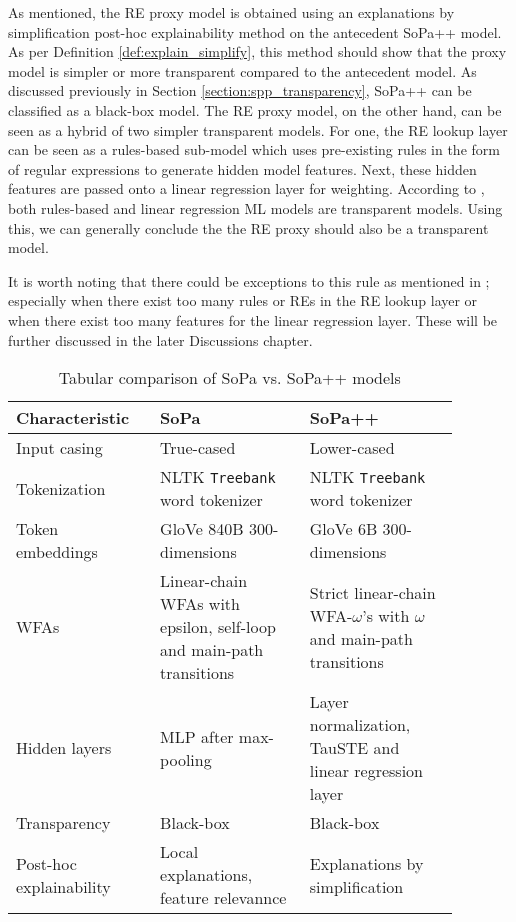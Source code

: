 \label{sec:re_transparency}

As mentioned, the RE proxy model is obtained using an explanations by
simplification post-hoc explainability method on the antecedent SoPa++ model. As
per Definition \ref{def:explain_simplify}, this method should show that the
proxy model is simpler or more transparent compared to the antecedent model. As
discussed previously in Section \ref{section:spp_transparency}, SoPa++ can be
classified as a black-box model. The RE proxy model, on the other hand, can be
seen as a hybrid of two simpler transparent models. For one, the RE lookup layer
can be seen as a rules-based sub-model which uses pre-existing rules in the form
of regular expressions to generate hidden model features. Next, these hidden
features are passed onto a linear regression layer for weighting. According to
\citet[Page 7, Section 3]{arrieta2020explainable}, both rules-based and linear
regression ML models are transparent models. Using this, we can generally
conclude the the RE proxy should also be a transparent model.

It is worth noting that there could be exceptions to this rule as mentioned in
\citet[Page 9, Table 2]{arrieta2020explainable}; especially when there exist too
many rules or REs in the RE lookup layer or when there exist too many features
for the linear regression layer. These will be further discussed in the later
Discussions chapter.

\begin{table}[t!]
  \centering {}
  \begin{tabular}{L{0.275\linewidth} L{0.3\linewidth} L{0.3\linewidth}}
    \toprule
    Characteristic & SoPa & SoPa++ \\
    \midrule
    Input casing & True-cased & Lower-cased \\ 
    Tokenization & NLTK \texttt{Treebank} word tokenizer & NLTK \texttt{Treebank} word tokenizer\\
    Token embeddings & GloVe 840B 300-dimensions & GloVe 6B 300-dimensions \\
    WFAs & Linear-chain WFAs with epsilon, self-loop and main-path transitions & Strict linear-chain WFA-$\omega$'s with $\omega$ and main-path transitions \\
    Hidden layers & MLP after max-pooling & Layer normalization, TauSTE and linear regression layer \\
    Transparency & Black-box & Black-box \\
    Post-hoc explainability & Local explanations, feature relevannce & Explanations by simplification \\
    \bottomrule
  \end{tabular}
  \caption{Tabular comparison of SoPa vs. SoPa++ models}
  \label{tab:sopa_spp_comparison}
\end{table}

